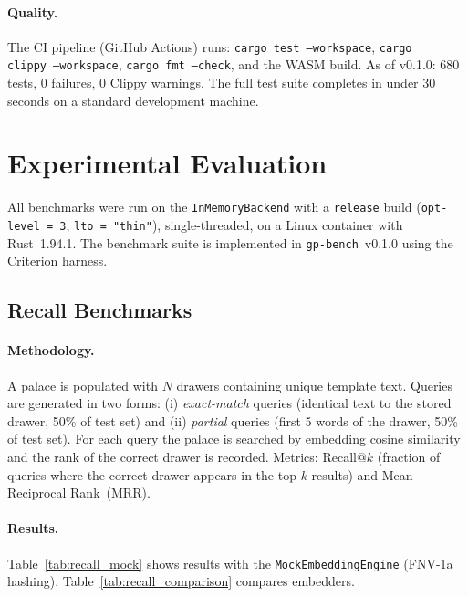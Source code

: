 \documentclass[11pt,a4paper]{article}
\begin{document}
\paragraph{Quality.}
The CI pipeline (GitHub Actions) runs: \texttt{cargo test~--workspace},
\texttt{cargo clippy~--workspace}, \texttt{cargo fmt~--check}, and the WASM
build.  As of v0.1.0: 680 tests, 0 failures, 0 Clippy warnings.  The full test
suite completes in under 30 seconds on a standard development machine.

\section{Experimental Evaluation}
\label{sec:eval}

All benchmarks were run on the \texttt{InMemoryBackend} with a
\texttt{release} build (\texttt{opt-level~=~3}, \texttt{lto~=~"thin"}),
single-threaded, on a Linux container with Rust~1.94.1.  The benchmark suite
is implemented in \texttt{gp-bench}~v0.1.0 using the Criterion harness.

\subsection{Recall Benchmarks}
\label{sec:recall_bench}

\paragraph{Methodology.}
A palace is populated with $N$ drawers containing unique template text.
Queries are generated in two forms: (i) \emph{exact-match} queries (identical
text to the stored drawer, 50\% of test set) and (ii) \emph{partial} queries
(first 5 words of the drawer, 50\% of test set).  For each query the palace is
searched by embedding cosine similarity and the rank of the correct drawer is
recorded.  Metrics: Recall@$k$ (fraction of queries where the correct drawer
appears in the top-$k$ results) and Mean Reciprocal Rank~(MRR).

\paragraph{Results.}
Table~\ref{tab:recall_mock} shows results with the \texttt{MockEmbeddingEngine}
(FNV-1a hashing).  Table~\ref{tab:recall_comparison} compares embedders.
\end{document}
